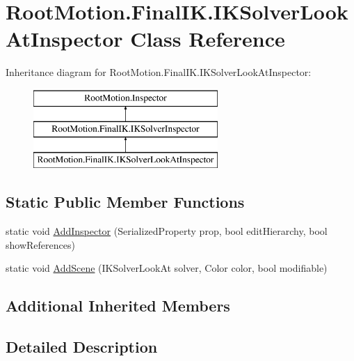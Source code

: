 \hypertarget{class_root_motion_1_1_final_i_k_1_1_i_k_solver_look_at_inspector}{}\section{Root\+Motion.\+Final\+I\+K.\+I\+K\+Solver\+Look\+At\+Inspector Class Reference}
\label{class_root_motion_1_1_final_i_k_1_1_i_k_solver_look_at_inspector}
Inheritance diagram for Root\+Motion.\+Final\+I\+K.\+I\+K\+Solver\+Look\+At\+Inspector\+:\begin{figure}[H]
\begin{center}
\leavevmode
\includegraphics[height=3.000000cm]{class_root_motion_1_1_final_i_k_1_1_i_k_solver_look_at_inspector}
\end{center}
\end{figure}
\subsection*{Static Public Member Functions}
\begin{DoxyCompactItemize}
\item 
static void \mbox{\hyperlink{class_root_motion_1_1_final_i_k_1_1_i_k_solver_look_at_inspector_a17e95fd83cbfe3b8a74a6f5ec4cd875c}{Add\+Inspector}} (Serialized\+Property prop, bool edit\+Hierarchy, bool show\+References)
\item 
static void \mbox{\hyperlink{class_root_motion_1_1_final_i_k_1_1_i_k_solver_look_at_inspector_a4b2cd2456dc816425823d29c6f916ec4}{Add\+Scene}} (I\+K\+Solver\+Look\+At solver, Color color, bool modifiable)
\end{DoxyCompactItemize}
\subsection*{Additional Inherited Members}


\subsection{Detailed Description}


